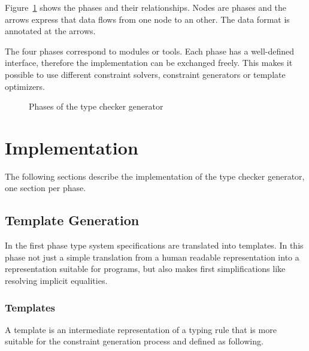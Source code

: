 Figure~\ref{fig:phases} shows the phases and their
relationships. Nodes are phases and the arrows express that data flows
from one node to an other. The data format is annotated at the arrows.

The four phases correspond to modules or tools. Each phase has a
well-defined interface, therefore the implementation can be exchanged
freely. This makes it possible to use different constraint solvers,
constraint generators or template optimizers.

\begin{figure}
\caption{Phases of the type checker generator}
\label{fig:phases}
\end{figure}
\section{Implementation}
\label{sec:implementation}
The following sections describe the implementation of the type checker
generator, one section per phase.

\subsection{Template Generation}
\label{sec:constraint-templates}
In the first phase type system specifications are translated into
templates. In this phase not just a simple translation from a human
readable representation into a representation suitable for programs,
but also makes first simplifications like resolving implicit
equalities.

\subsubsection{Templates}
A template is an intermediate representation of a typing rule that is
more suitable for the constraint generation process and defined as
following.

